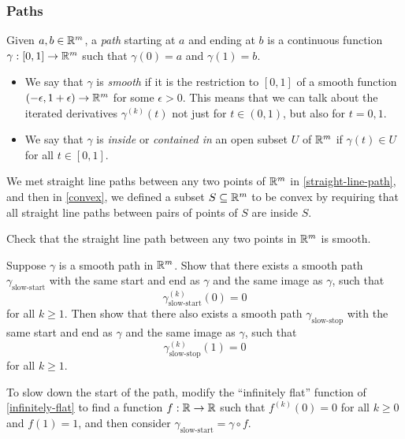\subsubsection*{Paths} \label{paths-multi}

\begin{definition}[Paths]
	Given $a, b \in \mathbb{R}^m$, a \emph{path} starting at $a$ and ending at $b$ is a continuous function $\gamma : [0, 1] \to \mathbb{R}^m$ such that $\gamma(0) = a$ and $\gamma(1) = b$. 
	\begin{itemize}
		\item We say that $\gamma$ is \emph{smooth} if it is the restriction to $[0,1]$ of a smooth function $(-\epsilon, 1+\epsilon) \to \mathbb{R}^m$ for some $\epsilon > 0$. This means that we can talk about the iterated derivatives $\gamma^{(k)}(t)$ not just for $t \in (0,1)$, but also for $t = 0, 1$. 
		\item We say that $\gamma$ is \emph{inside} or \emph{contained in} an open subset $U$ of $\mathbb{R}^m$ if $\gamma(t) \in U$ for all $t \in [0,1]$.
	\end{itemize}
\end{definition}

We met straight line paths between any two points of $\mathbb{R}^m$ in \cref{straight-line-path}, and then in \cref{convex}, we defined a subset $S \subseteq \mathbb{R}^m$ to be convex by requiring that all straight line paths between pairs of points of $S$ are inside $S$. 

\begin{exercise}
	Check that the straight line path between any two points in $\mathbb{R}^m$ is smooth. 
\end{exercise} 

\begin{exercise} \label{slowing-down-paths}
	Suppose $\gamma$ is a smooth path in $\mathbb{R}^m$. Show that there exists a smooth path $\gamma_{\text{slow-start}}$ with the same start and end as $\gamma$ and the same image as $\gamma$, such that 
	\[ \gamma_{\text{slow-start}}^{(k)}(0) = 0 \]
	for all $k \geq 1$. Then show that there also exists a smooth path $\gamma_{\text{slow-stop}}$ with the same start and end as $\gamma$ and the same image as $\gamma$, such that 
	\[ \gamma_{\text{slow-stop}}^{(k)}(1) = 0 \]
	for all $k \geq 1$. 
	\begin{hint}
		To slow down the start of the path, modify the ``infinitely flat'' function of  \cref{infinitely-flat} to find a function $f : \mathbb{R} \to \mathbb{R}$ such that $f^{(k)}(0) = 0$ for all $k \geq 0$ and $f(1) = 1$, and then consider $\gamma_{\text{slow-start}} = \gamma \circ f$. 
	\end{hint}
\end{exercise}

